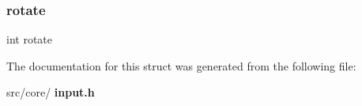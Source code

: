 \mbox{\label{structinput_a0b95db0f87fcbe71c3bbda1fa359606f}} 
\subsubsection{rotate}
{\footnotesize\ttfamily int rotate}



The documentation for this struct was generated from the following file\+:\begin{DoxyCompactItemize}
\item 
src/core/\textbf{ input.\+h}\end{DoxyCompactItemize}
